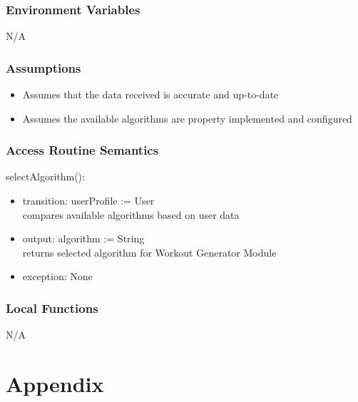 \documentclass[12pt, titlepage]{article}
\begin{document}
\subsubsection{Environment Variables}
N/A

\subsubsection{Assumptions}
\begin{itemize}
\item Assumes that the data received is accurate and up-to-date
\item Assumes the available algorithms are property implemented and configured
\end{itemize}


\subsubsection{Access Routine Semantics}

\noindent selectAlgorithm():
\begin{itemize}
\item transition: userProfile := User \\
compares available algorithms based on user data
\item output: algorithm := String \\
returns selected algorithm for Workout Generator Module
\item exception: None
\end{itemize}


\subsubsection{Local Functions}
N/A

\newpage



\section{Appendix} \label{Appendix}
\end{document}
